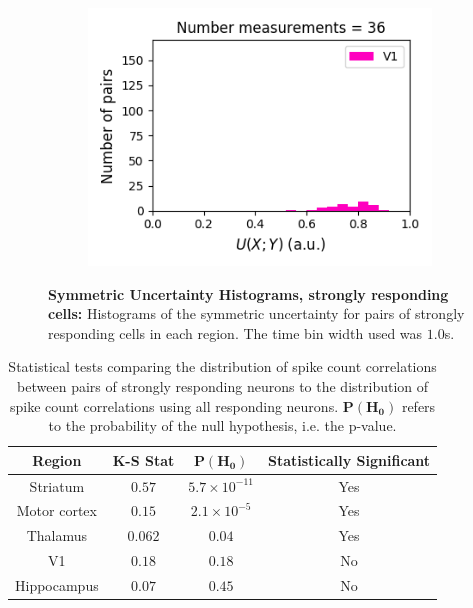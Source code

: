 \documentclass[a4paper,12pt]{article}
\theoremstyle{definition}
\begin{document}
\begin{figure}[p]
\begin{subfigure}{0.5\textwidth}
    \includegraphics[width=\textwidth]{figures/strong_v1_6_1p0_symm_unc_histogram.png}
  \end{subfigure}
  \caption{\textbf{Symmetric Uncertainty Histograms, strongly responding cells:} Histograms of the symmetric uncertainty for pairs of strongly responding cells in each region. The time bin width used was $1.0$s.}
  \label{fig:strong_sym_unc_histograms}
\end{figure}

\begin{table}[ht!]
  \begin{center}
    \caption{Statistical tests comparing the distribution of spike count correlations between pairs of strongly responding neurons to the distribution of spike count correlations using all responding neurons. $\mathbf{P(H_0)}$ refers to the probability of the null hypothesis, i.e. the p-value.}
    \label{tab:strong_corr_ks_test}
    \begin{tabular}{c|c|c|c} %
      \textbf{Region} & \textbf{K-S Stat} & $\mathbf{P(H_0)}$ & \textbf{Statistically Significant}\\
      \hline
      Striatum      & $0.57$    & $5.7 \times 10^{-11}$   & Yes \\
      Motor cortex  & $0.15$    & $2.1 \times 10^{-5}$    & Yes \\
      Thalamus      & $0.062$   & $0.04$                  & Yes \\
      V1            & $0.18$    & $0.18$                  & No \\
      Hippocampus   & $0.07$    & $0.45$                  & No \\
    \end{tabular}
  \end{center}
\end{table}
\end{document}
